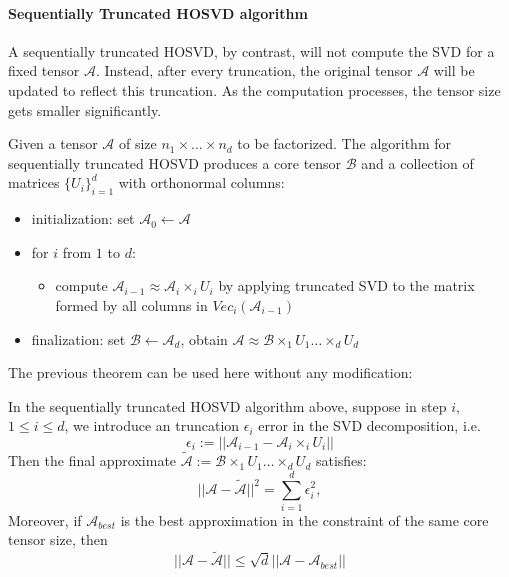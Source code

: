 \documentclass[12pt]{article}
\begin{document}
\paragraph{Sequentially Truncated HOSVD algorithm}
A sequentially truncated HOSVD, by contrast, will not compute the SVD for a fixed tensor $\mathcal{A}$. Instead, after every truncation, the original tensor $\mathcal{A}$ will be updated to reflect this truncation. As the computation processes, the tensor size gets smaller significantly.

\begin{myalgo}
Given a tensor $\mathcal{A}$ of size $n_1 \times \dots \times n_d$ to be factorized. The algorithm for sequentially truncated HOSVD produces a core tensor $\mathcal{B}$ and a collection of matrices $\{U_i\}_{i = 1}^d$ with orthonormal columns: 
\begin{itemize}
\item initialization: set $\mathcal{A}_0 \leftarrow \mathcal{A}$
\item for $i$ from $1$ to $d$: 
	\begin{itemize}
		\item compute $\mathcal{A}_{i-1} \approx \mathcal{A}_i \times_i U_i $ by applying truncated SVD to the matrix formed by all columns in $Vec_{i}(\mathcal{A}_{i-1})$
	\end{itemize}
\item finalization: set $\mathcal{B} \leftarrow \mathcal{A}_d$, obtain $\mathcal{A} \approx  \mathcal{B} \times_1 U_1 \dots \times_d U_d $
\end{itemize}
\end{myalgo}

The previous theorem can be used here without any modification:
\begin{mycor}
\label{hosvdcor}
In the sequentially truncated HOSVD algorithm above, suppose in step $i$, $1 \leq i \leq d$, we introduce an truncation $\epsilon_i$  error in the SVD decomposition, i.e.
$$ \epsilon_i :=  || \mathcal{A}_{i - 1} - \mathcal{A}_i \times_i U_i || $$ 
Then the final approximate $\tilde{\mathcal{A}} :=  \mathcal{B} \times_1 U_1 \dots \times_d U_d $ satisfies:
$$ || \mathcal{A} - \tilde{\mathcal{A}} || ^2  = \sum_{i = 1}^d \epsilon_i^2,$$
Moreover, if $\mathcal{A}_{best}$ is the best approximation in the constraint of the same core tensor size, then 
$$ || \mathcal{A} - \tilde{\mathcal{A}} || \leq \sqrt{d} || \mathcal{A} - \mathcal{A}_{best}||$$
\end{mycor}
\end{document}
